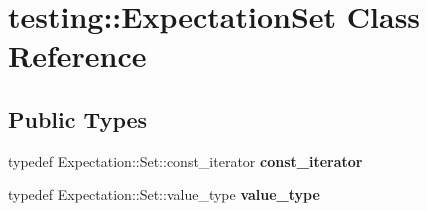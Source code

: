 \hypertarget{classtesting_1_1ExpectationSet}{}\section{testing\+:\+:Expectation\+Set Class Reference}
\label{classtesting_1_1ExpectationSet}
\subsection*{Public Types}
\begin{DoxyCompactItemize}
\item 
typedef Expectation\+::\+Set\+::const\+\_\+iterator {\bfseries const\+\_\+iterator}\hypertarget{classtesting_1_1ExpectationSet_ab269a45f80d8c4f747b29de454a084bb}{}\label{classtesting_1_1ExpectationSet_ab269a45f80d8c4f747b29de454a084bb}

\item 
typedef Expectation\+::\+Set\+::value\+\_\+type {\bfseries value\+\_\+type}\hypertarget{classtesting_1_1ExpectationSet_aab6d2d4800cec231bcedae33deaca7f6}{}\label{classtesting_1_1ExpectationSet_aab6d2d4800cec231bcedae33deaca7f6}

\end{DoxyCompactItemize}
